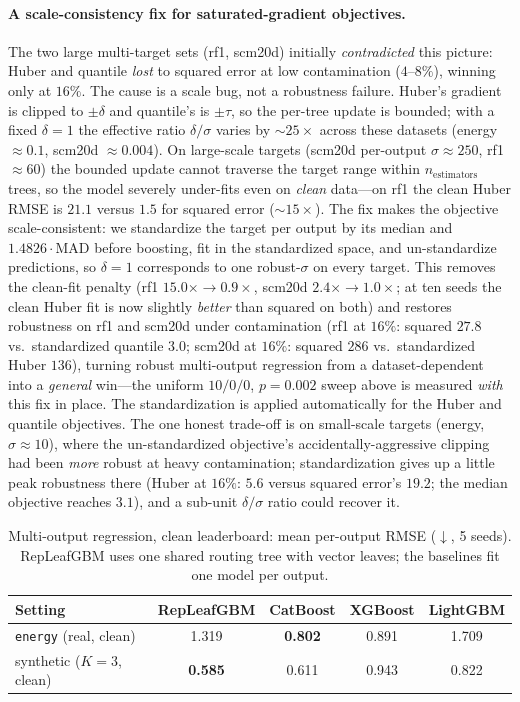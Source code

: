 \documentclass[11pt]{article}
\begin{document}
\paragraph{A scale-consistency fix for saturated-gradient objectives.} The two large
multi-target sets (rf1, scm20d) initially \emph{contradicted} this picture: Huber and
quantile \emph{lost} to squared error at low contamination ($4$--$8\%$), winning only at
$16\%$. The cause is a scale bug, not a robustness failure. Huber's gradient is clipped to
$\pm\delta$ and quantile's is $\pm\tau$, so the per-tree update is bounded; with a fixed
$\delta=1$ the effective ratio $\delta/\sigma$ varies by ${\sim}25\times$ across these
datasets (energy ${\approx}0.1$, scm20d ${\approx}0.004$). On large-scale targets (scm20d
per-output $\sigma{\approx}250$, rf1 ${\approx}60$) the bounded update cannot traverse the
target range within $n_\text{estimators}$ trees, so the model severely under-fits even on
\emph{clean} data---on rf1 the clean Huber RMSE is $21.1$ versus $1.5$ for squared error
(${\sim}15\times$). The fix makes the objective scale-consistent: we standardize the target
per output by its median and $1.4826\cdot\mathrm{MAD}$ before boosting, fit in the
standardized space, and un-standardize predictions, so $\delta=1$ corresponds to one
robust-$\sigma$ on every target. This removes the clean-fit penalty (rf1
$15.0\times{\rightarrow}0.9\times$, scm20d $2.4\times{\rightarrow}1.0\times$; at ten seeds
the clean Huber fit is now slightly \emph{better} than squared on both) and restores
robustness on rf1 and scm20d under contamination (rf1 at $16\%$: squared $27.8$ vs.\
standardized quantile $3.0$; scm20d at $16\%$: squared $286$ vs.\ standardized Huber
$136$), turning robust multi-output regression from a dataset-dependent into a
\emph{general} win---the uniform $10/0/0$, $p=0.002$ sweep above is measured \emph{with}
this fix in place. The standardization is applied automatically for the Huber and quantile
objectives. The one honest trade-off is on small-scale targets (energy, $\sigma{\approx}10$),
where the un-standardized objective's accidentally-aggressive clipping had been \emph{more}
robust at heavy contamination; standardization gives up a little peak robustness there
(Huber at $16\%$: $5.6$ versus squared error's $19.2$; the median objective reaches $3.1$),
and a sub-unit $\delta/\sigma$ ratio could recover it.

\begin{table}[t]
\centering
\caption{Multi-output regression, clean leaderboard: mean per-output RMSE ($\downarrow$,
5 seeds). RepLeafGBM uses one shared routing tree with vector leaves; the baselines fit one
model per output.}
\label{tab:multioutput}
\begin{tabular}{lcccc}
\toprule
Setting & RepLeafGBM & CatBoost & XGBoost & LightGBM \\
\midrule
\texttt{energy} (real, clean)     & 1.319 & \textbf{0.802} & 0.891 & 1.709 \\
synthetic ($K{=}3$, clean)        & \textbf{0.585} & 0.611 & 0.943 & 0.822 \\
\bottomrule
\end{tabular}
\end{table}
\end{document}
